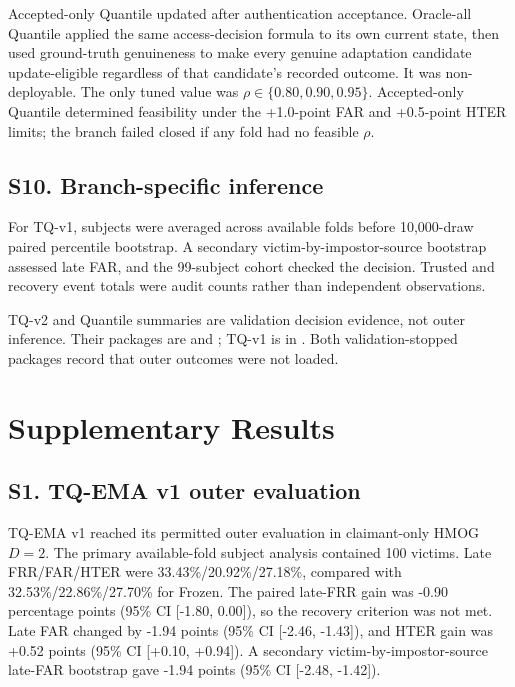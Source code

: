\documentclass[technologies,supfile,submit,moreauthors]{Definitions/mdpi}
\begin{document}
Accepted-only Quantile updated after authentication acceptance. Oracle-all Quantile applied the same access-decision formula to its own current state, then used ground-truth genuineness to make every genuine adaptation candidate update-eligible regardless of that candidate's recorded outcome. It was non-deployable. The only tuned value was \(\rho\in\{0.80,0.90,0.95\}\). Accepted-only Quantile determined feasibility under the +1.0-point FAR and +0.5-point HTER limits; the branch failed closed if any fold had no feasible \(\rho\).

\subsection*{S10. Branch-specific inference}\label{sm:s10}

For TQ-v1, subjects were averaged across available folds before 10,000-draw paired percentile bootstrap. A secondary victim-by-impostor-source bootstrap assessed late FAR, and the 99-subject cohort checked the decision. Trusted and recovery event totals were audit counts rather than independent observations.

TQ-v2 and Quantile summaries are validation decision evidence, not outer inference. Their packages are \texttt{} and \texttt{}; TQ-v1 is in \texttt{}. Both validation-stopped packages record that outer outcomes were not loaded.

\section*{Supplementary Results}\label{sr:overview}

\subsection*{S1. TQ-EMA v1 outer evaluation}\label{sr:s1}

TQ-EMA v1 reached its permitted outer evaluation in claimant-only HMOG \(D=2\). The primary available-fold subject analysis contained 100 victims. Late FRR/\allowbreak FAR/\allowbreak HTER were 33.43\%/20.92\%/27.18\%, compared with 32.53\%/22.86\%/27.70\% for Frozen. The paired late-FRR gain was -0.90 percentage points (95\% CI {[}-1.80, 0.00{]}), so the recovery criterion was not met. Late FAR changed by -1.94 points (95\% CI {[}-2.46, -1.43{]}), and HTER gain was +0.52 points (95\% CI {[}+0.10, +0.94{]}). A secondary victim-by-impostor-source late-FAR bootstrap gave -1.94 points (95\% CI {[}-2.48, -1.42{]}).
\end{document}

